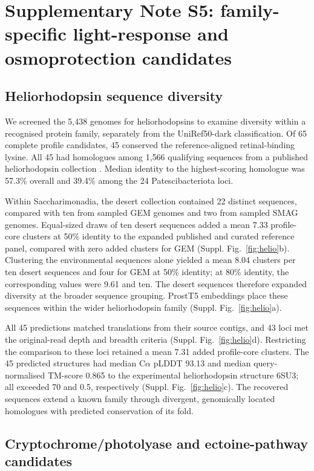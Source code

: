 \section*{Supplementary Note S5: family-specific light-response and osmoprotection candidates}

\subsection*{Heliorhodopsin sequence diversity}

We screened the 5{,}438 genomes for heliorhodopsins to examine diversity within a recognised protein family, separately from the UniRef50-dark classification. Of 65 complete profile candidates, 45 conserved the reference-aligned retinal-binding lysine. All 45 had homologues among 1{,}566 qualifying sequences from a published heliorhodopsin collection \citep{bulzu2021heliorhodopsin}. Median identity to the highest-scoring homologue was 57.3\% overall and 39.4\% among the 24 Patescibacteriota loci.

Within Saccharimonadia, the desert collection contained 22 distinct sequences, compared with ten from sampled GEM genomes and two from sampled SMAG genomes. Equal-sized draws of ten desert sequences added a mean 7.33 profile-core clusters at 50\% identity to the expanded published and curated reference panel, compared with zero added clusters for GEM (Suppl. Fig.~\ref{fig:helio}b). Clustering the environmental sequences alone yielded a mean 8.04 clusters per ten desert sequences and four for GEM at 50\% identity; at 80\% identity, the corresponding values were 9.61 and ten. The desert sequences therefore expanded diversity at the broader sequence grouping. ProstT5 embeddings place these sequences within the wider heliorhodopsin family (Suppl. Fig.~\ref{fig:helio}a).

All 45 predictions matched translations from their source contigs, and 43 loci met the original-read depth and breadth criteria (Suppl. Fig.~\ref{fig:helio}d). Restricting the comparison to these loci retained a mean 7.31 added profile-core clusters. The 45 predicted structures had median C$\alpha$ pLDDT 93.13 and median query-normalised TM-score 0.865 to the experimental heliorhodopsin structure 6SU3; all exceeded 70 and 0.5, respectively (Suppl. Fig.~\ref{fig:helio}c). The recovered sequences extend a known family through divergent, genomically located homologues with predicted conservation of its fold.

\subsection*{Cryptochrome/photolyase and ectoine-pathway candidates}


